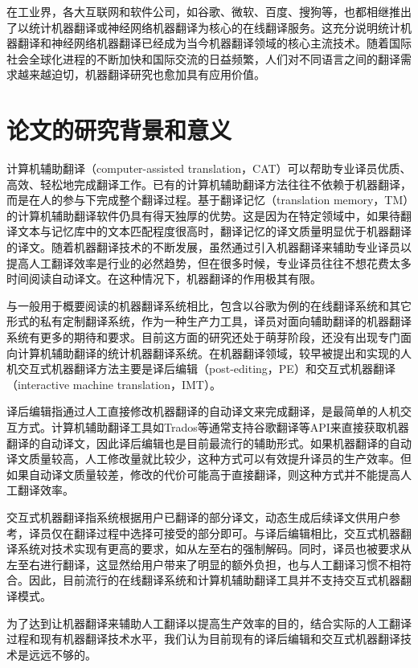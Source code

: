 在工业界，各大互联网和软件公司，如谷歌、微软、百度、搜狗等，也都相继推出了以统计机器翻译或神经网络机器翻译为核心的在线翻译服务。这充分说明统计机器翻译和神经网络机器翻译已经成为当今机器翻译领域的核心主流技术。随着国际社会全球化进程的不断加快和国际交流的日益频繁，人们对不同语言之间的翻译需求越来越迫切，机器翻译研究也愈加具有应用价值。

\section{论文的研究背景和意义}

计算机辅助翻译（computer-assisted translation，CAT）可以帮助专业译员优质、高效、轻松地完成翻译工作。已有的计算机辅助翻译方法往往不依赖于机器翻译，而是在人的参与下完成整个翻译过程。基于翻译记忆（translation memory，TM）的计算机辅助翻译软件仍具有得天独厚的优势。这是因为在特定领域中，如果待翻译文本与记忆库中的文本匹配程度很高时，翻译记忆的译文质量明显优于机器翻译的译文。随着机器翻译技术的不断发展，虽然通过引入机器翻译来辅助专业译员以提高人工翻译效率是行业的必然趋势，但在很多时候，专业译员往往不想花费太多时间阅读自动译文。在这种情况下，机器翻译的作用极其有限。

与一般用于概要阅读的机器翻译系统相比，包含以谷歌为例的在线翻译系统和其它形式的私有定制翻译系统，作为一种生产力工具，译员对面向辅助翻译的机器翻译系统有更多的期待和要求。目前这方面的研究还处于萌芽阶段，还没有出现专门面向计算机辅助翻译的统计机器翻译系统。在机器翻译领域，较早被提出和实现的人机交互式机器翻译方法主要是译后编辑（post-editing，PE）和交互式机器翻译（interactive machine translation，IMT）。

译后编辑指通过人工直接修改机器翻译的自动译文来完成翻译，是最简单的人机交互方式。计算机辅助翻译工具如Trados等通常支持谷歌翻译等API来直接获取机器翻译的自动译文，因此译后编辑也是目前最流行的辅助形式。如果机器翻译的自动译文质量较高，人工修改量就比较少，这种方式可以有效提升译员的生产效率。但如果自动译文质量较差，修改的代价可能高于直接翻译，则这种方式并不能提高人工翻译效率。

交互式机器翻译指系统根据用户已翻译的部分译文，动态生成后续译文供用户参考，译员仅在翻译过程中选择可接受的部分即可。与译后编辑相比，交互式机器翻译系统对技术实现有更高的要求，如从左至右的强制解码。同时，译员也被要求从左至右进行翻译，这显然给用户带来了明显的额外负担，也与人工翻译习惯不相符合。因此，目前流行的在线翻译系统和计算机辅助翻译工具并不支持交互式机器翻译模式。

为了达到让机器翻译来辅助人工翻译以提高生产效率的目的，结合实际的人工翻译过程和现有机器翻译技术水平，我们认为目前现有的译后编辑和交互式机器翻译技术是远远不够的。

